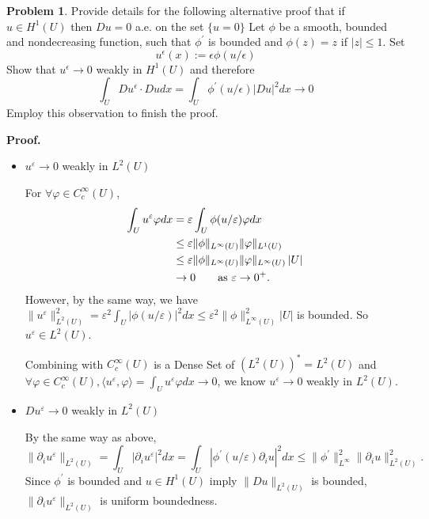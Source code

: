 \documentclass[a4paper]{book}
\newenvironment{eproof}
{\noindent\textbf{Proof.}}
{\qedhere}
\numberwithin{equation}{chapter}
\theoremstyle{definition}
\newtheorem{problem}[exm]{Problem}
\begin{document}
\begin{problem}
  Provide details for the following alternative proof that if $u \in H^{1}(U)$ then $D u=0$ a.e. on the set $\{u=0\}$
  Let $\phi$ be a smooth, bounded and nondecreasing function, such that $\phi^{\prime}$ is bounded and $\phi(z)=z$ if $|z| \leq 1 .$ Set
  \[
    u^{\epsilon}(x):=\epsilon \phi(u / \epsilon)
  \]
  Show that $u^{\epsilon} \rightarrow 0$ weakly in $H^{1}(U)$ and therefore
  \[
    \int_{U} D u^{\epsilon} \cdot D u d x=\int_{U} \phi^{\prime}(u / \epsilon)|D u|^{2} d x \rightarrow 0
  \]
  Employ this observation to finish the proof.
\end{problem}

\begin{eproof}
  \begin{itemize}
  \item $u^\varepsilon \rightarrow 0$ weakly in $L^2(U)$
    
    For $\forall \varphi \in C_c^\infty (U)$,
    \begin{align*}
      \int_U u^\varepsilon \varphi dx &= \varepsilon \int_U \phi(u/\varepsilon) \varphi dx \\
                                      & \leq \varepsilon \|\phi\|_{L^\infty(U)} \| \varphi\|_{L^1(U)} \\
                                      & \leq \varepsilon \| \phi \|_{L^\infty(U)} \| \varphi \|_{L^\infty(U)} \left| U \right| \\
      &\rightarrow 0 \qquad \textmd{as } \varepsilon \rightarrow 0^+.
    \end{align*}
    However, by the same way, we have $\| u^\varepsilon \|_{L^2(U)}^2 = \varepsilon^2 \int_U \left| \phi(u/\varepsilon) \right|^2 dx \leq \varepsilon^2 \|\phi\|_{L^\infty(U)}^2 \left| U \right|$ is bounded. So $u^\varepsilon \in L^2(U)$.

    Combining with $C_c^\infty(U)$ is a Dense Set of $(L^2(U))^* = L^2(U)$ and $\forall \varphi \in C_c^\infty (U),\langle u^\varepsilon , \varphi \rangle = \int_U u^\varepsilon \varphi dx \rightarrow 0$, we know $u^\varepsilon \rightarrow 0$ weakly in $L^2(U)$.

  \item $D u^\varepsilon \rightarrow 0$ weakly in $L^2(U)$

    By the same way as above,
    \[\| \partial_i u^\varepsilon \|_{L^2(U)} = \int_U \left| \partial_i u^\varepsilon \right|^2 dx
      = \int_U \left| \phi^\prime(u/\varepsilon) \partial_i u \right|^2 dx
      \leq \| \phi^\prime \|_{L^\infty}^2 \|\partial_i u \|_{L^2(U)}^2.\]
    Since $\phi^\prime$ is bounded and $u \in H^1(U)$ imply $\| Du\|_{L^2(U)}$ is bounded, $\| \partial_i u^\varepsilon \|_{L^2(U)}$ is uniform boundedness.


\end{itemize}
\end{eproof}
\end{document}
